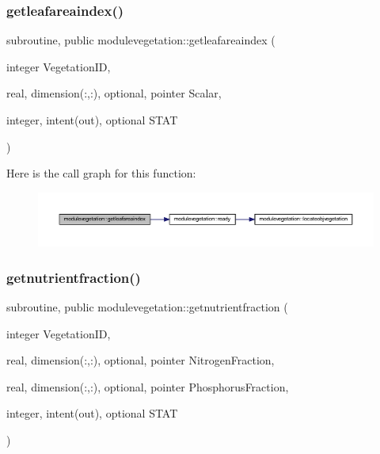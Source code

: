 \subsubsection{\texorpdfstring{getleafareaindex()}{getleafareaindex()}}
{\footnotesize\ttfamily subroutine, public modulevegetation\+::getleafareaindex (\begin{DoxyParamCaption}\item[{integer}]{Vegetation\+ID,  }\item[{real, dimension(\+:,\+:), optional, pointer}]{Scalar,  }\item[{integer, intent(out), optional}]{S\+T\+AT }\end{DoxyParamCaption})}

Here is the call graph for this function\+:\nopagebreak
\begin{figure}[H]
\begin{center}
\leavevmode
\includegraphics[width=350pt]{namespacemodulevegetation_acf7940a010ec79861c9eaee61e66b333_cgraph}
\end{center}
\end{figure}
\mbox{\label{namespacemodulevegetation_afcdcb6390a6a25bc7c5e5d70525ac36d}} 
\subsubsection{\texorpdfstring{getnutrientfraction()}{getnutrientfraction()}}
{\footnotesize\ttfamily subroutine, public modulevegetation\+::getnutrientfraction (\begin{DoxyParamCaption}\item[{integer}]{Vegetation\+ID,  }\item[{real, dimension(\+:,\+:), optional, pointer}]{Nitrogen\+Fraction,  }\item[{real, dimension(\+:,\+:), optional, pointer}]{Phosphorus\+Fraction,  }\item[{integer, intent(out), optional}]{S\+T\+AT }\end{DoxyParamCaption})}

